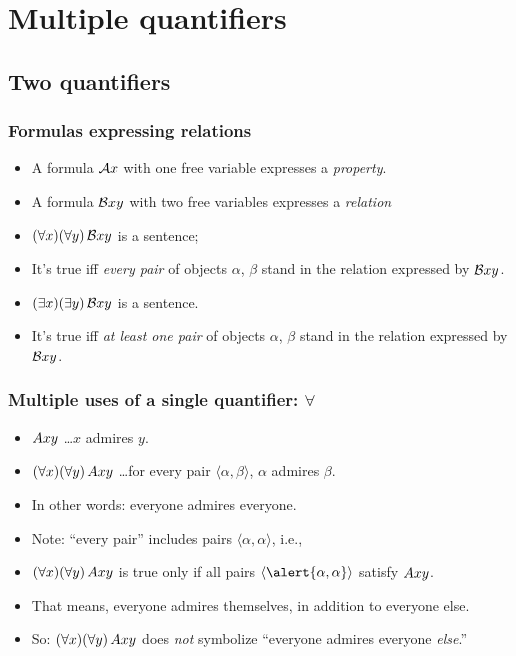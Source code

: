 ﻿%

\setcounter{section}{7}

\section{Multiple quantifiers}

\subsection{Two quantifiers}

\begin{frame}
  \frametitle{Formulas expressing relations}

\begin{itemize}[<+->]
  \item A formula $\mathcal{A}x$ with one free variable expresses a \emph{property}.
  \item A formula $\mathcal{B}xy$ with two free variables expresses a \emph{relation}
  \item $(\forall x)(\forall y)\, \mathcal{B}xy$ is a sentence; 
  \item It's true iff 
  \emph{every pair} of objects $\alpha$, $\beta$ stand in the relation expressed by $\mathcal{B}xy$.
  \item $(\exists x)(\exists y)\, \mathcal{B}xy$ is a sentence.
  \item It's true iff
  \emph{at least one pair} of objects $\alpha$, $\beta$ stand in the relation expressed by $\mathcal{B}xy$.
\end{itemize}
\end{frame}

\begin{frame}
  \frametitle{Multiple uses of a single quantifier: $\forall$}

\begin{itemize}[<+->]
  \item $Axy$ \dots $x$ admires $y$.
  \item $(\forall x)(\forall y)\, Axy$ \dots for every pair $\langle
  \alpha,\beta\rangle$, $\alpha$ admires $\beta$.
  \item In other words: everyone admires everyone.
  \item Note: ``every pair'' includes pairs $\langle\alpha, \alpha\rangle$, i.e.,
  \item $(\forall x)(\forall y)\, Axy$ is true only if all pairs $\langle \alert{\alpha, \alpha}\rangle$ satisfy $Axy$.
  \item That means, everyone admires themselves, in addition to everyone else.
  \item So: $(\forall x)(\forall y)\, Axy$ does \emph{not} symbolize ``everyone admires everyone \emph{else}.''
\end{itemize}

\end{frame}

